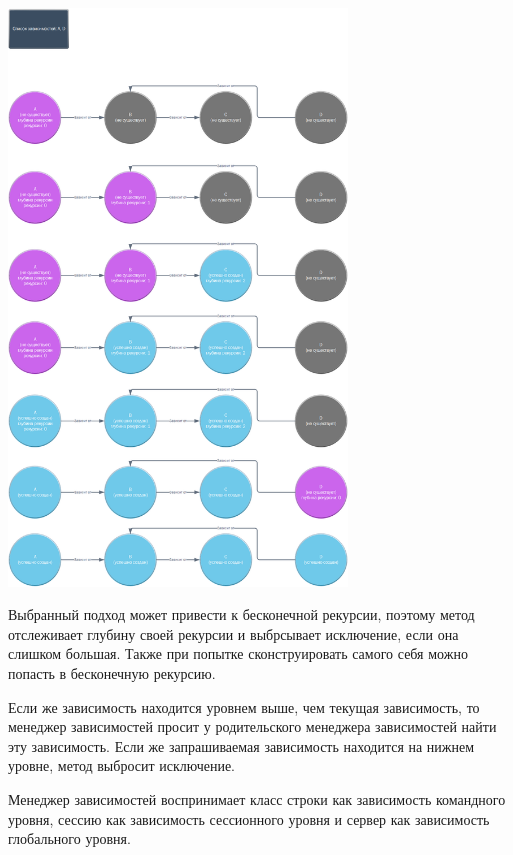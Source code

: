 \documentclass[a4paper,14pt]{extarticle}
\begin{document}
\begin{center}
\includegraphics[width=90mm]{dep_level}
\end{center}

Выбранный подход может привести к бесконечной рекурсии, поэтому метод отслеживает глубину своей рекурсии и выбрсывает исключение, 
если она слишком большая. Также при попытке сконструировать самого себя можно попасть в бесконечную рекурсию.

Если же зависимость находится уровнем выше, чем текущая зависимость, то менеджер зависимостей просит у родительского 
менеджера зависимостей найти эту зависимость. Если же запрашиваемая зависимость находится на нижнем уровне, метод выбросит
исключение. 

Менеджер зависимостей воспринимает класс строки как зависимость командного уровня, сессию как зависимость сессионного уровня
и сервер как зависимость глобального уровня. 
\end{document}
